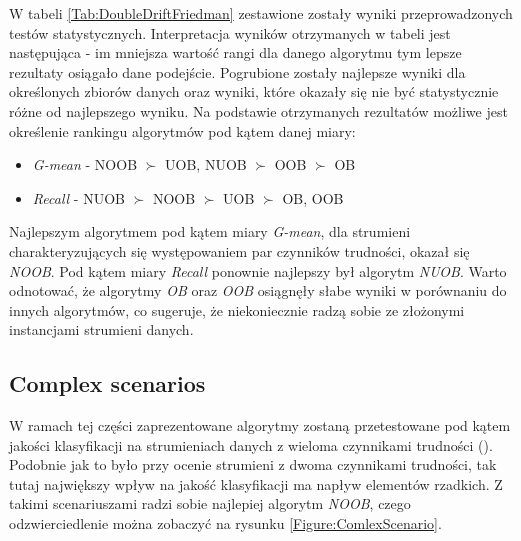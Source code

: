 \noindent W tabeli \ref{Tab:DoubleDriftFriedman} zestawione zostały wyniki przeprowadzonych testów statystycznych. Interpretacja wyników otrzymanych w tabeli jest następująca - im mniejsza wartość rangi dla danego algorytmu tym lepsze rezultaty osiągało dane podejście. Pogrubione zostały najlepsze wyniki dla określonych zbiorów danych oraz wyniki, które okazały się nie być statystycznie różne od najlepszego wyniku. Na podstawie otrzymanych rezultatów możliwe jest określenie rankingu algorytmów pod kątem danej miary:

\begin{itemize}
    \item \textit{G-mean} - NOOB $\succ$ UOB, NUOB $\succ$ OOB $\succ$ OB
    \item \textit{Recall} - NUOB $\succ$ NOOB $\succ$ UOB $\succ$ OB, OOB
\end{itemize}

\noindent Najlepszym algorytmem pod kątem miary \textit{G-mean}, dla strumieni charakteryzujących się występowaniem par czynników trudności, okazał się \textit{NOOB}. Pod kątem miary \textit{Recall} ponownie najlepszy był algorytm \textit{NUOB}. Warto odnotować, że algorytmy \textit{OB} oraz \textit{OOB} osiągnęły słabe wyniki w porównaniu do innych algorytmów, co sugeruje, że niekoniecznie radzą sobie ze złożonymi instancjami strumieni danych.

\subsection{Complex scenarios}

\noindent W ramach tej części zaprezentowane algorytmy zostaną przetestowane pod kątem jakości klasyfikacji na strumieniach danych z wieloma czynnikami trudności (). Podobnie jak to było przy ocenie strumieni z dwoma czynnikami trudności, tak tutaj największy wpływ na jakość klasyfikacji ma napływ elementów rzadkich. Z takimi scenariuszami radzi sobie najlepiej algorytm \textit{NOOB}, czego odzwierciedlenie można zobaczyć na rysunku \ref{Figure:ComlexScenario}.

\newpage

